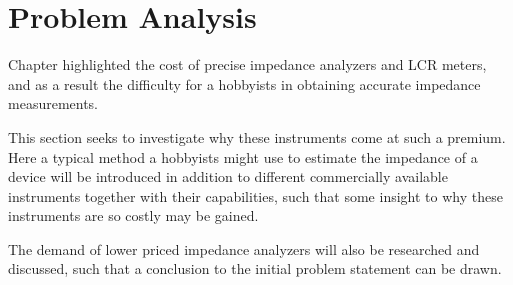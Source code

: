 \chapter{Problem Analysis} \label{ch:ProblemAnalysis}
Chapter  highlighted the cost of precise impedance analyzers and LCR meters, and as a result the difficulty for a hobbyists in obtaining accurate impedance measurements.

This section seeks to investigate why these instruments come at such a premium. Here a typical method a hobbyists might use to estimate the impedance of a device will be introduced in addition to different commercially available instruments together with their capabilities,
such that some insight to why these instruments are so costly may be gained. 

The demand of lower priced impedance analyzers will also be researched and discussed, such that a conclusion to the initial problem statement can be drawn.
